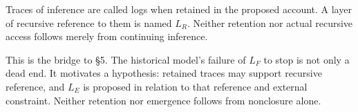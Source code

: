 Traces of inference are called logs when retained in the proposed account. A layer of recursive reference to them is named $L_R$. Neither retention nor actual recursive access follows merely from continuing inference.

This is the bridge to \S{}5. The historical model's failure of $L_F$ to stop is not only a dead end. It motivates a hypothesis: retained traces may support recursive reference, and $L_E$ is proposed in relation to that reference and external constraint. Neither retention nor emergence follows from nonclosure alone.

\bigskip
